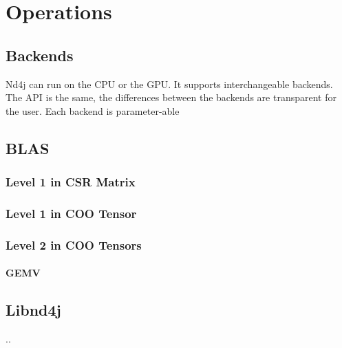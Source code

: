\chapter{Operations}
\section{Backends}

Nd4j can run on the CPU or the GPU. It supports interchangeable backends. The API is the same, the differences between the backends are transparent for the user.
Each backend is parameter-able 
\section{BLAS}

\subsection{Level 1 in CSR Matrix}

\subsection{Level 1 in COO Tensor}

\subsection{Level 2 in COO Tensors}
\subsubsection{GEMV}
\section{Libnd4j}
..